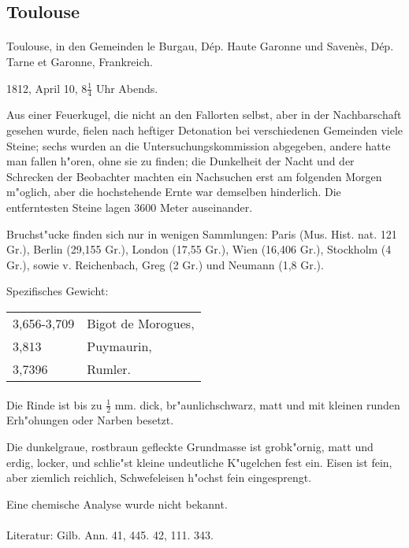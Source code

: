 \documentclass[a4paper, 11pt, oneside]{article}
\begin{document}
\subsection{Toulouse}
\normalsize
\paragraph{}
Toulouse, in den Gemeinden le Burgau, Dép. Haute Garonne und Savenès, Dép. Tarne et Garonne, Frankreich.

1812, April 10, $8\frac{1}{4}$ Uhr Abends.

Aus einer Feuerkugel, die nicht an den Fallorten selbst, aber in der Nachbarschaft gesehen wurde, fielen nach heftiger Detonation bei verschiedenen Gemeinden viele Steine; sechs wurden an die Untersuchungskommission abgegeben, andere hatte man fallen h"oren, ohne sie zu finden; die Dunkelheit der Nacht und der Schrecken der Beobachter machten ein Nachsuchen erst am folgenden Morgen m"oglich, aber die hochstehende Ernte war demselben hinderlich. Die entferntesten Steine lagen 3600 Meter auseinander.

Bruchst"ucke finden sich nur in wenigen Sammlungen: Paris (Mus. Hist. nat. 121 Gr.), Berlin (29,155 Gr.), London (17,55 Gr.), Wien (16,406 Gr.), Stockholm (4 Gr.), sowie v. Reichenbach, Greg (2 Gr.) und Neumann (1,8 Gr.).

Spezifisches Gewicht:
\begin{table}[!ht]
    \centering
    \begin{tabular}{l l}
        3,656-3,709 & Bigot de Morogues,\\
        3,813 & Puymaurin,\\
        3,7396 & Rumler.
    \end{tabular}
\end{table}
\paragraph{}
Die Rinde ist bis zu $\frac{1}{2}$ mm. dick, br"aunlichschwarz, matt und mit kleinen runden Erh"ohungen oder Narben besetzt.

Die dunkelgraue, rostbraun gefleckte Grundmasse ist grobk"ornig, matt und erdig, locker, und schlie"st kleine undeutliche K"ugelchen fest ein. Eisen ist fein, aber ziemlich reichlich, Schwefeleisen h"ochst fein eingesprengt.

Eine chemische Analyse wurde nicht bekannt.
\footnotesize
\paragraph{}
Literatur: Gilb. Ann. 41, 445. 42, 111. 343.
\end{document}
